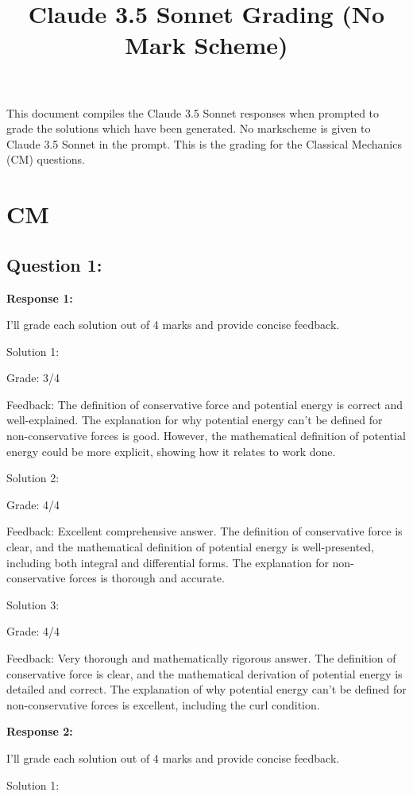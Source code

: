 \documentclass[a4paper,11pt]{article}
\title{Claude 3.5 Sonnet Grading (No Mark Scheme)}
\begin{document}
\maketitle
This document compiles the Claude 3.5 Sonnet responses when prompted to grade the solutions which have been generated. No markscheme is given to Claude 3.5 Sonnet in the prompt. This is the grading for the Classical Mechanics (CM) questions. 

\section{CM}
\subsection*{Question 1:}

\textbf{Response 1:}

I'll grade each solution out of 4 marks and provide concise feedback.

Solution 1:

Grade: 3/4

Feedback: The definition of conservative force and potential energy is correct and well-explained. The explanation for why potential energy can't be defined for non-conservative forces is good. However, the mathematical definition of potential energy could be more explicit, showing how it relates to work done.

Solution 2:

Grade: 4/4

Feedback: Excellent comprehensive answer. The definition of conservative force is clear, and the mathematical definition of potential energy is well-presented, including both integral and differential forms. The explanation for non-conservative forces is thorough and accurate.

Solution 3:

Grade: 4/4

Feedback: Very thorough and mathematically rigorous answer. The definition of conservative force is clear, and the mathematical derivation of potential energy is detailed and correct. The explanation of why potential energy can't be defined for non-conservative forces is excellent, including the curl condition.

\bigskip    
\textbf{Response 2:}

I'll grade each solution out of 4 marks and provide concise feedback.

Solution 1:
\end{document}
